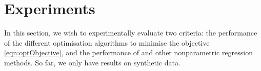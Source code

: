 
\section{Experiments}
\label{sec:experiments}

In this section, we wish to experimentally evaluate two criteria: the
performance of the different optimisation algorithms to minimise the \addkrrs
objective \eqref{eqn:optObjective}, and the performance of \addkrrs and other
nonparametric regression methods. So far, we only have results on synthetic
data.


\begin{figure}
\centering
{}
\end{figure}
